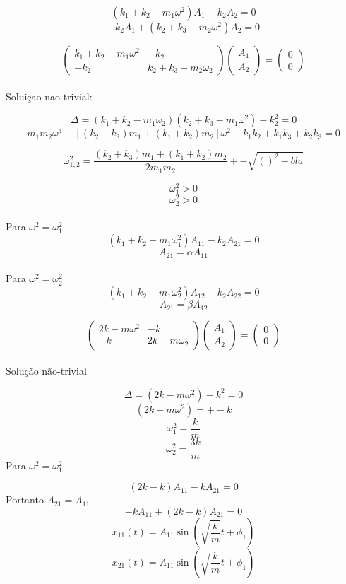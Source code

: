 \documentclass[a4paper, 12pt]{article}
\begin{document}
\[(k_{1}+k_{2}-m_{1}\omega^{2})A_{1}-k_{2}A_{2}=0\]
\[-k_{2}A_{1}+(k_{2}+k_{3}-m_{2}\omega^{2})A_{2}=0\]

\[\begin{pmatrix}
k_{1}+k_{2}-m_{1}\omega^{2} & -k_{2} \\ 
-k_{2} & k_{2}+k_{3}-m_{2}\omega_{2}
\end{pmatrix} \begin{pmatrix}
A_{1} \\ 
A_{2}
\end{pmatrix}=\begin{pmatrix}
0 \\ 
0
\end{pmatrix} \] 
\\

Soluiçao nao trivial:

\[\Delta=(k_{1}+k_{2}-m_{1}\omega_{2})(k_{2}+k_{3}-m_{1}\omega^{2})-k_{2}^{2}=0\]
\[m_{1}m_{2}\omega^{4}-[(k_{2}+k_{3})m_{1}+(k_{1}+k_{2})m_{2}]\omega^{2}+k_{1}k_{2}+k_{1}k_{3}+k_{2}k_{3}=0\]

\[\omega_{1,2}^{2}=\frac{(k_{2}+k_{3})m_{1}+(k_{1}+k_{2})m_{2}}{2m_{1}m_{2}}+- \sqrt{()^{2}- bla}\]

\[\omega_{1}^{2}>0\]
\[\omega_{2}^{2}>0\]
\\
Para $\omega^{2}=\omega_{1}^{2}$
\[(k_{1}+k_{2}-m_{1}\omega_{1}^{2})A_{11}-k_{2}A_{21}=0\]
\[A_{21}=\alpha A_{11}\]
\\
Para $\omega^{2}=\omega_{2}^{2}$
\[(k_{1}+k_{2}-m_{1}\omega_{2}^{2})A_{12}-k_{2}A_{22}=0\]
\[A_{21}=\beta A_{12}\]

\[
\begin{pmatrix}
2k-m\omega^{2} & -k \\ 
-k & 2k-m\omega_{2}
\end{pmatrix} \begin{pmatrix}
A_{1} \\ 
A_{2}
\end{pmatrix}=\begin{pmatrix}
0 \\ 
0
\end{pmatrix} 
\]
\\
Solução não-trivial

\[\Delta=(2k-m\omega^{2})-k^{2}=0\]
\[(2k-m\omega^{2})=+-k\]
\[\omega_{1}^{2}=\frac{k}{m}\]
\[\omega_{2}^{2}=\frac{3k}{m}\]
Para $\omega^{2}=\omega_{1}^{2}$

\[(2k-k)A_{11}-kA_{21}=0\]
Portanto $A_{21}=A_{11}$
\[-kA_{11}+(2k-k)A_{21}=0\]
\[x_{11}(t)=A_{11}\sin(\sqrt{\frac{k}{m}}t+\phi _{1})\]
\[x_{21}(t)=A_{11}\sin(\sqrt{\frac{k}{m}}t+\phi _{1})\]
\end{document}

